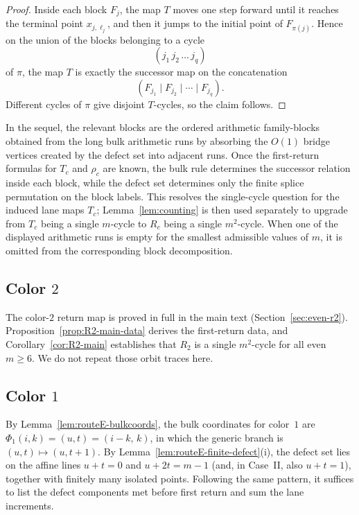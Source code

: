 \documentclass[11pt]{article}
\begin{document}
\begin{proof}
Inside each block $F_j$, the map $T$ moves one step forward until it reaches the terminal point $x_{j,\ell_j}$, and then it jumps to the initial point of $F_{\pi(j)}$.
Hence on the union of the blocks belonging to a cycle
\[
(j_1\,j_2\,\dots\,j_q)
\]
of $\pi$, the map $T$ is exactly the successor map on the concatenation
\[
(F_{j_1}\mid F_{j_2}\mid \cdots \mid F_{j_q}).
\]
Different cycles of $\pi$ give disjoint $T$-cycles, so the claim follows.
\end{proof}

In the sequel, the relevant blocks are the ordered arithmetic family-blocks obtained from the long bulk arithmetic runs by absorbing the $O(1)$ bridge vertices created by the defect set into adjacent runs.
Once the first-return formulas for $T_c$ and $\rho_c$ are known, the bulk rule determines the successor relation inside each block, while the defect set determines only the finite splice permutation on the block labels.
This resolves the single-cycle question for the induced lane maps $T_c$; Lemma~\ref{lem:counting} is then used separately to upgrade from $T_c$ being a single $m$-cycle to $R_c$ being a single $m^2$-cycle.
When one of the displayed arithmetic runs is empty for the smallest admissible values of $m$, it is omitted from the corresponding block decomposition.

\subsection{Color $2$}

The color-$2$ return map is proved in full in the main text (Section~\ref{sec:even-r2}).
Proposition~\ref{prop:R2-main-data} derives the first-return data, and Corollary~\ref{cor:R2-main} establishes that $R_2$ is a single $m^2$-cycle for all even $m\ge 6$.
We do not repeat those orbit traces here.


\subsection{Color $1$}

By Lemma~\ref{lem:routeE-bulkcoords}, the bulk coordinates for color~$1$ are $\Phi_1(i,k)=(u,t)=(i-k,\,k)$, in which the generic branch is $(u,t)\mapsto(u,t+1)$.
By Lemma~\ref{lem:routeE-finite-defect}\textup{(i)}, the defect set lies on the affine lines $u+t=0$ and $u+2t=m-1$ (and, in Case~II, also $u+t=1$), together with finitely many isolated points.
Following the same pattern, it suffices to list the defect components met before first return and sum the lane increments.
\end{document}
